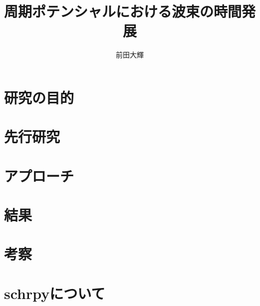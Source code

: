 \documentclass[autodetect-engine,dvipdfmx-if-dvi,ja=standard,a4paper]{bxjsreport}
\author{前田大輝}
\title{周期ポテンシャルにおける波束の時間発展}
\begin{document}
    \maketitle
    \chapter{研究の目的}
    \chapter{先行研究}
    \chapter{アプローチ}
    \chapter{結果}
    \chapter{考察}
    \chapter{schrpyについて}
\end{document}
